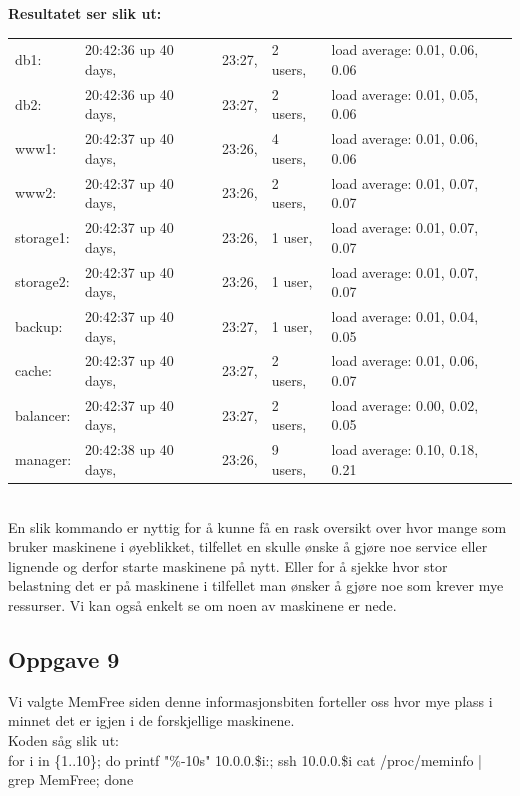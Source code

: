 \documentclass[a4paper, norsk, 12pt]{article}
\begin{document}
\textbf{Resultatet ser slik ut:}\\
\begin{tabular}{lllll}
db1: & 20:42:36 up 40 days, & 23:27, & 2 users, & load average: 0.01, 0.06, 0.06\\
db2: & 20:42:36 up 40 days, & 23:27, & 2 users, & load average: 0.01, 0.05, 0.06\\
www1: & 20:42:37 up 40 days, & 23:26, & 4 users,& load average: 0.01, 0.06, 0.06\\
www2: & 20:42:37 up 40 days, & 23:26, & 2 users,& load average: 0.01, 0.07, 0.07\\
storage1: & 20:42:37 up 40 days, & 23:26, & 1 user, & load average: 0.01, 0.07, 0.07\\
storage2: & 20:42:37 up 40 days, & 23:26, & 1 user, & load average: 0.01, 0.07, 0.07\\
backup: & 20:42:37 up 40 days, & 23:27, & 1 user, & load average: 0.01, 0.04, 0.05\\
cache: & 20:42:37 up 40 days, & 23:27, & 2 users, & load average: 0.01, 0.06, 0.07\\
balancer: & 20:42:37 up 40 days, & 23:27, & 2 users, & load average: 0.00, 0.02, 0.05\\
manager: & 20:42:38 up 40 days, & 23:26, & 9 users, & load average: 0.10, 0.18, 0.21
\end{tabular}
\\

En slik kommando er nyttig for å kunne få en rask oversikt over hvor mange som bruker maskinene i øyeblikket, tilfellet en skulle ønske å gjøre noe service eller lignende og derfor starte maskinene på nytt. Eller for å sjekke hvor stor belastning det er på maskinene i tilfellet man ønsker å gjøre noe som krever mye ressurser. Vi kan også enkelt se om noen av maskinene er nede.

\subsection{Oppgave 9}
Vi valgte MemFree siden denne informasjonsbiten forteller oss hvor mye plass i minnet det er igjen i de forskjellige maskinene. \\

Koden såg slik ut:\\
for i in \{1..10\}; do printf "\%-10s" 10.0.0.\$i:; ssh 10.0.0.\$i cat /proc/meminfo | grep MemFree; done\\
\end{document}
